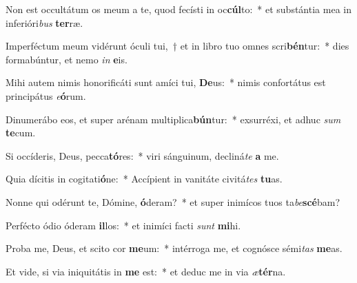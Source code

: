 \item Non est occultátum os meum a te, quod fecísti in oc\textbf{cúl}to:~* et substántia mea in inferióri\textit{bus} \textbf{ter}ræ.
\item Imperféctum meum vidérunt óculi tui,~† et in libro tuo omnes scri\textbf{bén}tur:~* dies formabúntur, et nemo \textit{in} \textbf{e}is.
\item Mihi autem nimis honorificáti sunt amíci tui, \textbf{De}us:~* nimis confortátus est principátus \textit{e}\textbf{ó}rum.
\item Dinumerábo eos, et super arénam multiplica\textbf{bún}tur:~* exsurréxi, et adhuc \textit{sum} \textbf{te}cum.
\item Si occíderis, Deus, pecca\textbf{tó}res:~* viri sánguinum, decliná\textit{te} \textbf{a} me.
\item Quia dícitis in cogitati\textbf{ó}ne:~* Accípient in vanitáte civitá\textit{tes} \textbf{tu}as.
\item Nonne qui odérunt te, Dómine, \textbf{ó}deram?~* et super inimícos tuos ta\textit{be}\textbf{scé}bam?
\item Perfécto ódio óderam \textbf{il}los:~* et inimíci facti \textit{sunt} \textbf{mi}hi.
\item Proba me, Deus, et scito cor \textbf{me}um:~* intérroga me, et cognósce sémi\textit{tas} \textbf{me}as.
\item Et vide, si via iniquitátis in \textbf{me} est:~* et deduc me in via \textit{æ}\textbf{tér}na.
